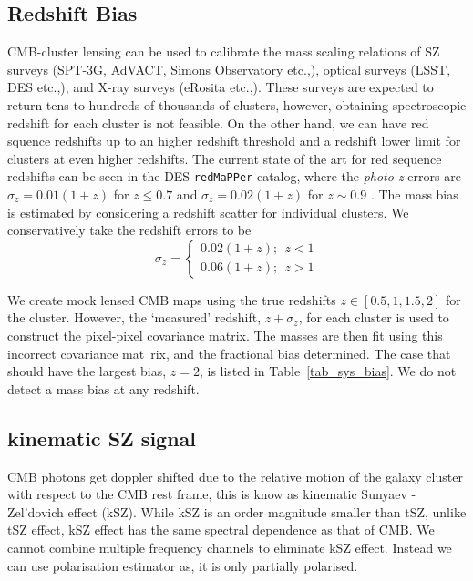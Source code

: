  \subsection{Redshift Bias}
CMB-cluster lensing can be used to calibrate the mass scaling relations of SZ surveys (SPT-3G, AdVACT, Simons Observatory etc.,), optical surveys (LSST, DES etc.,), and X-ray surveys (eRosita etc.,). These surveys are expected to return tens to hundreds of thousands of clusters, however, obtaining spectroscopic redshift for each cluster is not feasible.  
On the other hand, we can have red squence redshifts up to an higher redshift threshold and a redshift lower limit for clusters at even higher redshifts. 
The current state of the art for red sequence redshifts can be seen in the  DES \texttt{redMaPPer} catalog, where the \emph{photo-z} errors are $\sigma_{z} = 0.01 (1+z)$ for $z \le 0.7$ and $\sigma_{z} = 0.02 (1+z)$ for $z \sim 0.9$ \citep{rykoff2016}. The mass bias is estimated by considering a redshift scatter for individual clusters. We conservatively take the redshift errors to be
\begin{equation}\nonumber
\sigma_z = \left\{
\begin{array}{l}
    0.02 (1+z);  ~~z < 1 \\
    0.06 (1+z);  ~~z > 1
  \end{array}\right.
\end{equation}

We create mock lensed CMB maps using the true redshifts $z\in[0.5, 1, 1.5, 2]$ for the cluster. However, the `measured' redshift, $z + \sigma_{z}$, for each cluster is used to construct the pixel-pixel covariance matrix. The masses are then fit using this incorrect covariance mat\
rix, and the fractional bias determined.                                                                        
The case that should have the largest bias, $z=2$, is listed in Table~\ref{tab_sys_bias}. We do not detect a mass bias at any redshift. 
 
\subsection{kinematic SZ signal}
CMB photons get doppler shifted due to the relative motion of the galaxy cluster with respect to the CMB rest frame, this is know as kinematic Sunyaev - Zel'dovich effect (kSZ).
While kSZ is an order magnitude smaller than tSZ, unlike tSZ effect, kSZ effect has the same spectral dependence as that of CMB. 
We cannot combine multiple frequency channels to eliminate kSZ effect. 
Instead we can use polarisation estimator as, it is only partially polarised.

